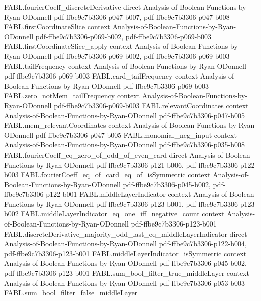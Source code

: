 \begin{theorem}
\proofstep
  {FABL.fourierCoeff_discreteDerivative}
  {direct}
  {Analysis-of-Boolean-Functions-by-Ryan-ODonnell}
  {pdf-ffbe9c7b3306-p047-b007,
    pdf-ffbe9c7b3306-p047-b008}
\proofstep
  {FABL.firstCoordinateSlice}
  {context}
  {Analysis-of-Boolean-Functions-by-Ryan-ODonnell}
  {pdf-ffbe9c7b3306-p069-b002,
    pdf-ffbe9c7b3306-p069-b003}
\proofstep
  {FABL.firstCoordinateSlice_apply}
  {context}
  {Analysis-of-Boolean-Functions-by-Ryan-ODonnell}
  {pdf-ffbe9c7b3306-p069-b002,
    pdf-ffbe9c7b3306-p069-b003}
\proofstep
  {FABL.tailFrequency}
  {context}
  {Analysis-of-Boolean-Functions-by-Ryan-ODonnell}
  {pdf-ffbe9c7b3306-p069-b003}
\proofstep
  {FABL.card_tailFrequency}
  {context}
  {Analysis-of-Boolean-Functions-by-Ryan-ODonnell}
  {pdf-ffbe9c7b3306-p069-b003}
\proofstep
  {FABL.zero_notMem_tailFrequency}
  {context}
  {Analysis-of-Boolean-Functions-by-Ryan-ODonnell}
  {pdf-ffbe9c7b3306-p069-b003}
\proofstep
  {FABL.relevantCoordinates}
  {context}
  {Analysis-of-Boolean-Functions-by-Ryan-ODonnell}
  {pdf-ffbe9c7b3306-p047-b005}
\proofstep
  {FABL.mem_relevantCoordinates}
  {context}
  {Analysis-of-Boolean-Functions-by-Ryan-ODonnell}
  {pdf-ffbe9c7b3306-p047-b005}
\proofstep
  {FABL.monomial_neg_input}
  {context}
  {Analysis-of-Boolean-Functions-by-Ryan-ODonnell}
  {pdf-ffbe9c7b3306-p035-b008}
\proofstep
  {FABL.fourierCoeff_eq_zero_of_odd_of_even_card}
  {direct}
  {Analysis-of-Boolean-Functions-by-Ryan-ODonnell}
  {pdf-ffbe9c7b3306-p121-b006,
    pdf-ffbe9c7b3306-p122-b003}
\proofstep
  {FABL.fourierCoeff_eq_of_card_eq_of_isSymmetric}
  {context}
  {Analysis-of-Boolean-Functions-by-Ryan-ODonnell}
  {pdf-ffbe9c7b3306-p045-b002,
    pdf-ffbe9c7b3306-p122-b001}
\proofstep
  {FABL.middleLayerIndicator}
  {context}
  {Analysis-of-Boolean-Functions-by-Ryan-ODonnell}
  {pdf-ffbe9c7b3306-p123-b001,
    pdf-ffbe9c7b3306-p123-b002}
\proofstep
  {FABL.middleLayerIndicator_eq_one_iff_negative_count}
  {context}
  {Analysis-of-Boolean-Functions-by-Ryan-ODonnell}
  {pdf-ffbe9c7b3306-p123-b001}
\proofstep
  {FABL.discreteDerivative_majority_odd_last_eq_middleLayerIndicator}
  {direct}
  {Analysis-of-Boolean-Functions-by-Ryan-ODonnell}
  {pdf-ffbe9c7b3306-p122-b004,
    pdf-ffbe9c7b3306-p123-b001}
\proofstep
  {FABL.middleLayerIndicator_isSymmetric}
  {context}
  {Analysis-of-Boolean-Functions-by-Ryan-ODonnell}
  {pdf-ffbe9c7b3306-p045-b002,
    pdf-ffbe9c7b3306-p123-b001}
\proofstep
  {FABL.sum_bool_filter_true_middleLayer}
  {context}
  {Analysis-of-Boolean-Functions-by-Ryan-ODonnell}
  {pdf-ffbe9c7b3306-p053-b003}
\proofstep
  {FABL.sum_bool_filter_false_middleLayer}

\end{theorem}
